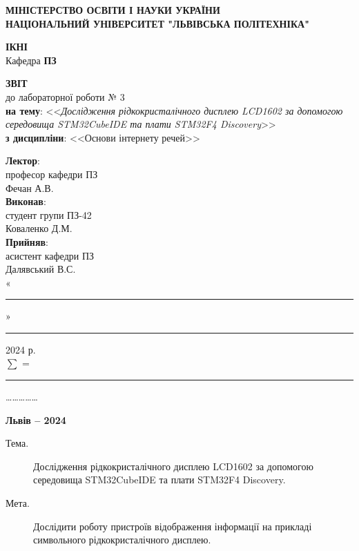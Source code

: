 \documentclass[oneside,14pt]{extarticle}
\newcommand\subject{Основи інтернету речей}
\newcommand\lecturer{професор кафедри ПЗ\\Фечан А.В.}
\newcommand\teacher{асистент кафедри ПЗ\\Далявський В.С.}
\newcommand\mygroup{ПЗ-42}
\newcommand\lab{3}
\newcommand\theme{Дослідження рідкокристалічного дисплею LCD1602 за допомогою
	середовища STM32CubeIDE та плати STM32F4 Discovery}
\newcommand\purpose{Дослідити роботу пристроїв відображення інформації на
	прикладі символьного рідкокристалічного дисплею}
\begin{document}
\begin{normalsize}
	\begin{titlepage}
		\thispagestyle{empty}
		\begin{center}
			\textbf{МІНІСТЕРСТВО ОСВІТИ І НАУКИ УКРАЇНИ\\
				НАЦІОНАЛЬНИЙ УНІВЕРСИТЕТ "ЛЬВІВСЬКА ПОЛІТЕХНІКА"}
		\end{center}
		\begin{flushright}
			\textbf{ІКНІ}\\
			Кафедра \textbf{ПЗ}
		\end{flushright}
		\vspace{80pt}
		\begin{center}
			\textbf{ЗВІТ}\\
			\vspace{10pt}
			до лабораторної роботи № \lab\\
			\textbf{на тему}: <<\textit{\theme}>>\\
			\textbf{з дисципліни}: <<\subject>>
		\end{center}
		\vspace{80pt}
		\begin{flushright}
			
			\textbf{Лектор}:\\
			\lecturer\\
			\vspace{28pt}
			\textbf{Виконав}:\\
			
			студент групи \mygroup\\
			Коваленко Д.М.\\
			\vspace{28pt}
			\textbf{Прийняв}:\\
			
			\teacher\\
			
			\vspace{28pt}
			«\rule{1cm}{0.15mm}» \rule{1.5cm}{0.15mm} 2024 р.\\
			$\sum$ = \rule{1cm}{0.15mm}……………\\
			
		\end{flushright}
		\vspace{\fill}
		\begin{center}
			\textbf{Львів – 2024}
		\end{center}
	\end{titlepage}
		
	\begin{description}
		\item[Тема.] \theme.
		\item[Мета.] \purpose.
	\end{description}


\end{normalsize}
\end{document}
